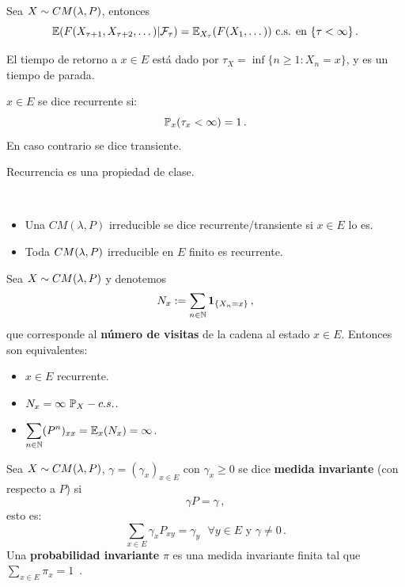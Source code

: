 \begin{theorem}
Sea $X\sim\cm$, entonces
$$ \E(F(X_{\tau+1},X_{\tau+2},\dots)|\mathcal{F}_\tau)=\E_{X_\tau}(F(X_1,\dots)) \mbox{ c.s. en }\{\tau<\infty\} \, .$$
\end{theorem}
\begin{remark}
El tiempo de retorno a $x\in E$ está dado por $\tau_X=\inf\{n\geq1:X_n=x\}$, y es un tiempo de parada.
\end{remark}
\begin{definition}
$x\in E$ se dice recurrente si:
$$ \P_x(\tau_x<\infty)=1 \, .$$
En caso contrario se dice transiente.
\end{definition}
\begin{remark}
Recurrencia es una propiedad de clase.
\end{remark}
\vspace{1cm}\\
\begin{proposition}
\beforeitemize
\begin{itemize}
    \item Una $CM(\lambda,P)$ irreducible se dice recurrente/transiente si $x\in E$ lo es.
    \item Toda $\cm$ irreducible en $E$ finito es recurrente.
\end{itemize}
\end{proposition}
\begin{theorem}
\label{theorem:visitas}
Sea $X\sim\cm$ y denotemos
$$ N_x:=\displaystyle\sum_{n\in\N}\mathbf{1}_{\{X_n=x\}} \, ,$$
que corresponde al \textbf{número de visitas} de la cadena al estado $x\in E$.
\newline Entonces son equivalentes:
\begin{itemize}
    \item $x\in E$ recurrente.
    \item $N_x=\infty \mbox{ }\P_X-{ c.s.}$.
    \item $\displaystyle\sum_{n\in \N}(P^n)_{xx}=\E_x(N_x)=\infty$.
\end{itemize}
\end{theorem}
\begin{definition}
Sea $X\sim\cm$, $\gamma=(\gamma_x)_{x\in E}$ con $\gamma_x\geq0$ se dice \textbf{medida invariante} (con respecto a $P$) si
$$ \gamma P = \gamma \, ,$$
esto es:
$$ \sum_{x\in E}\gamma_xP_{xy}=\gamma_{y}\mbox{ }\forall y\in E \mbox{ y }\gamma\neq 0 \, .$$
Una \textbf{probabilidad invariante} $\pi$ es una medida invariante finita tal que $\sum_{x\in E}\pi_x = 1$ \,.
\end{definition}
